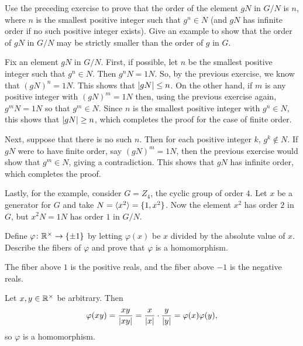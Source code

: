  Use the preceding exercise to prove that the order of the
element $gN$ in $G/N$ is $n$, where $n$ is the smallest positive
integer such that $g^n\in N$ (and $gN$ has infinite order if no such
positive integer exists). Give an example to show that the order of
$gN$ in $G/N$ may be strictly smaller than the order of $g$ in $G$.
\begin{solution}
  Fix an element $gN$ in $G/N$. First, if possible, let $n$ be the
  smallest positive integer such that $g^n\in N$. Then $g^nN =
  1N$. So, by the previous exercise, we know that $(gN)^n = 1N$. This
  shows that $\lvert{gN}\rvert\leq n$. On the other hand, if $m$ is any
  positive integer with $(gN)^m = 1N$ then, using the previous
  exercise again, $g^mN = 1N$ so that $g^m\in N$. Since $n$ is the
  smallest positive integer with $g^n\in N$, this shows that
  $\lvert{gN}\rvert\geq n$, which completes the proof for the case of finite
  order.

  Next, suppose that there is no such $n$. Then for each positive
  integer $k$, $g^k\not\in N$. If $gN$ were to have finite order, say
  $(gN)^m = 1N$, then the previous exercise would show that
  $g^m\in N$, giving a contradiction. This shows that $gN$ has
  infinite order, which completes the proof.

  Lastly, for the example, consider $G = Z_4$, the cyclic group of
  order $4$. Let $x$ be a generator for $G$ and take
  $N = \langle{x^2}\rangle = \{1, x^2\}$. Now the element $x^2$ has order $2$ in
  $G$, but $x^2N = 1N$ has order $1$ in $G/N$.
\end{solution}

 Define $\varphi\colon\mathbb{R}^\times\to\{\pm1\}$ by letting
$\varphi(x)$ be $x$ divided by the absolute value of $x$. Describe the
fibers of $\varphi$ and prove that $\varphi$ is a homomorphism.
\begin{solution}
  The fiber above $1$ is the positive reals, and the fiber above $-1$
  is the negative reals.

  Let $x,y\in\mathbb{R}^\times$ be arbitrary. Then
  \begin{equation*}
    \varphi(xy)
    = \frac{xy}{\lvert{xy}\rvert}
    = \frac{x}{\lvert{x}\rvert}\cdot\frac{y}{\lvert{y}\rvert}
    = \varphi(x)\varphi(y),
  \end{equation*}
  so $\varphi$ is a homomorphism.
\end{solution}

